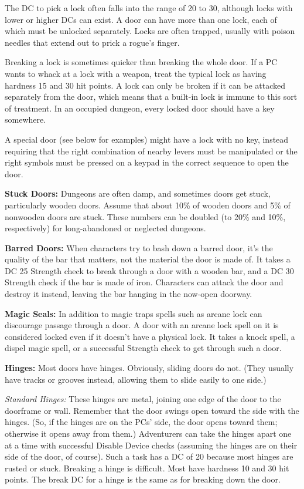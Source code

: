 The  DC to pick a lock often falls into the range of 20 to 30, although locks with lower or higher DCs can exist. A door can have more than one lock, each of which must be unlocked separately. Locks are often trapped, usually with poison needles that extend out to prick a rogue's finger.

Breaking a lock is sometimes quicker than breaking the whole door. If a PC wants to whack at a lock with a weapon, treat the typical lock as having hardness 15 and 30 hit points. A lock can only be broken if it can be attacked separately from the door, which means that a built-in lock is immune to this sort of treatment. In an occupied dungeon, every locked door should have a key somewhere.

A special door (see below for examples) might have a lock with no key, instead requiring that the right combination of nearby levers must be manipulated or the right symbols must be pressed on a keypad in the correct sequence to open the door.

\textbf{Stuck Doors:} Dungeons are often damp, and sometimes doors get stuck, particularly wooden doors. Assume that about 10\% of wooden doors and 5\% of nonwooden doors are stuck. These numbers can be doubled (to 20\% and 10\%, respectively) for long-abandoned or neglected dungeons.

\textbf{Barred Doors:} When characters try to bash down a barred door, it's the quality of the bar that matters, not the material the door is made of. It takes a DC 25 Strength check to break through a door with a wooden bar, and a DC 30 Strength check if the bar is made of iron. Characters can attack the door and destroy it instead, leaving the bar hanging in the now-open doorway.

\textbf{Magic Seals:} In addition to magic traps spells such as arcane lock can discourage passage through a door. A door with an arcane lock spell on it is considered locked even if it doesn't have a physical lock. It takes a knock spell, a dispel magic spell, or a successful Strength check to get through such a door.

\textbf{Hinges:} Most doors have hinges. Obviously, sliding doors do not. (They usually have tracks or grooves instead, allowing them to slide easily to one side.)

\textit{Standard Hinges:} These hinges are metal, joining one edge of the door to the doorframe or wall. Remember that the door swings open toward the side with the hinges. (So, if the hinges are on the PCs' side, the door opens toward them; otherwise it opens away from them.) Adventurers can take the hinges apart one at a time with successful Disable Device checks (assuming the hinges are on their side of the door, of course). Such a task has a DC of 20 because most hinges are rusted or stuck. Breaking a hinge is difficult. Most have hardness 10 and 30 hit points. The break DC for a hinge is the same as for breaking down the door.

